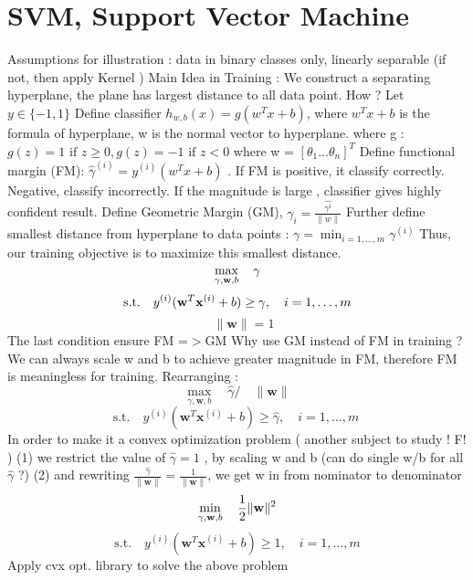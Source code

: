 \documentclass{article}
\begin{document}
\section{SVM, Support Vector Machine}
Assumptions for illustration : data in binary classes only, linearly separable (if not, then apply Kernel )
\newline
Main Idea in Training : We construct a separating hyperplane, the plane has largest distance to all data point. 
\newline 
How ? 
\newline
Let \(y \in \{-1, 1\}\) 
\newline
Define classifier \(h_{w,b}(x) = g(w^T x +b)\), where \(w^T x +b\) is the formula of hyperplane, w is the normal vector to hyperplane.
\newline 
where g : \(g(z) = 1 \text{ if } z \ge 0 ,  g(z) = -1 \text{ if } z < 0\)
\newline 
where w = \([\theta_1...\theta_n]^T\)
\newline 
Define functional margin (FM): \(\hat{\gamma}^{(i)} = y^{(i)} (w^T x + b)\) .
\newline 
If FM is positive, it classify correctly. Negative, classify incorrectly. 
\newline
If the magnitude is large , classifier gives highly confident result. 
\newline
Define Geometric Margin (GM), \(\gamma_i = \frac{\hat{\gamma^i}}{\|w\|}\)
\newline
Further define smallest distance from hyperplane to data points : \(\gamma = \min_{i=1, \ldots, m} \gamma^{(i)}\)
\newline 
Thus, our training objective is to maximize this smallest distance.
\[
\max_{\gamma, \mathbf{w}, b}  \quad \gamma \\
\]
\[
\text{s.t.}  \quad y^{(i)} (\mathbf{w}^T \mathbf{x}^{(i)} + b) \geq \gamma, \quad i = 1, \ldots, m \\
\]
\[
 \quad \|\mathbf{w}\| = 1
\]
The last condition ensure FM =\(>\)GM 
\newline
Why use GM instead of FM in training ? We can always scale w and b to achieve greater magnitude in FM, therefore FM is meaningless for training. 
\newline 
Rearranging :
\newline
\[
\max_{\gamma, \mathbf{w}, b}  \quad \hat{\gamma} / \quad \|\mathbf{w}\|
\]
\[
\text{s.t.}  \quad y^{(i)} (\mathbf{w}^T \mathbf{x}^{(i)} + b) \geq \hat{\gamma}, \quad i = 1, \ldots, m \
\]
In order to make it a convex optimization problem ( another subject to study ! F! )\newline
(1) we restrict the value of \(\hat{\gamma} = 1\) , by scaling w and b (can do single w/b for all \(\hat{\gamma} \) ?)  \newline
(2) and rewriting \(\frac{\hat{\gamma}}{\|\mathbf{w}\|} = \frac{1}{\|\mathbf{w}\|}\),
we  get w in from nominator to denominator
\[
\min_{\gamma, \mathbf{w}, b}  \quad \frac{1}{2} \|\mathbf{w}\|^2 \\
\]
\[
\text{s.t.} \quad y^{(i)} (\mathbf{w}^T \mathbf{x}^{(i)} + b) \geq 1, \quad i = 1, \ldots, m
\]
Apply cvx opt. library to solve the above problem 
\end{document}
